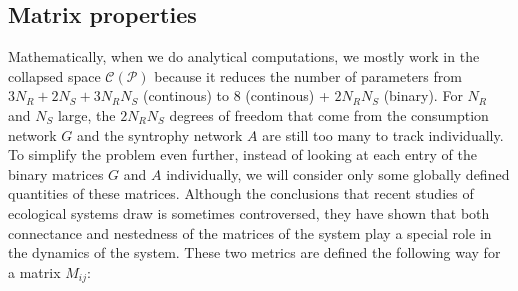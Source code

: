 \documentclass[12pt, titlepage]{report}
\begin{document}
\subsection{Matrix properties}
Mathematically, when we do analytical computations, we mostly work in the collapsed space $\mathcal{C}(\mathcal{P})$ because it reduces the number of parameters from $3N_R+2N_S+3N_RN_S$ (continous) to $8$ (continous) + $2N_RN_S$ (binary). For $N_R$ and $ N_S$ large, the $2N_R N_S$ degrees of freedom that come from the consumption network $G$ and the syntrophy network $A$ are still too many to track individually. To simplify the problem even further, instead of looking at each entry of the binary matrices $G$ and $A$ individually, we will consider only some globally defined quantities of these matrices. Although the conclusions that recent studies of ecological systems draw is sometimes controversed, they have shown that both connectance \cite{thebault_stability_2010, james_disentangling_2012} and nestedness \cite{bastolla_architecture_2009, rohr_structural_2014, pascual-garcia_mutualism_2017} of the matrices of the system play a special role in the dynamics of the system. These two metrics are defined the following way for a matrix $M_{ij}$:
\end{document}
